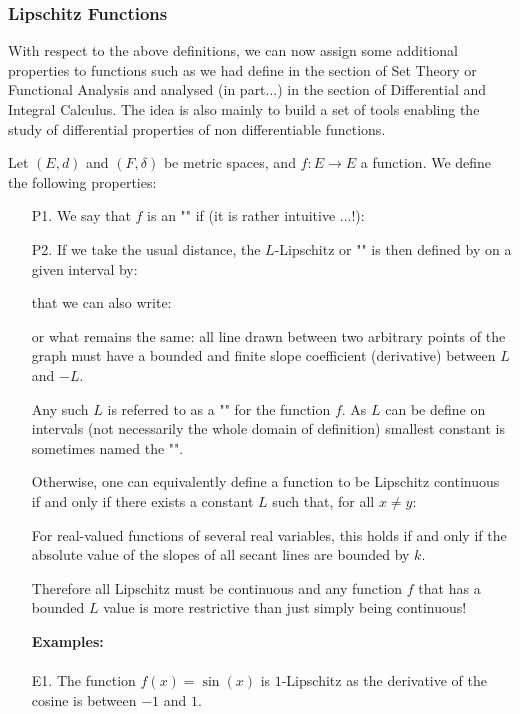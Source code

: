 	
	\subsubsection{Lipschitz Functions}\label{lipschitz functions}
	With respect to the above definitions, we can now assign some additional properties to functions such as we had define in the section of Set Theory or Functional Analysis and analysed (in part...) in the section of Differential and Integral Calculus. The idea is also mainly to build a set of tools enabling the study of differential properties of non differentiable functions.
	
	Let $(E, d)$ and $(F,\delta)$ be metric spaces, and $f:E \rightarrow E$ a function. We define the following properties:
	\begin{enumerate}
		\item[P1.] We say that $f$ is an "" if (it is rather intuitive ...!):
		
		
		\item[P2.] If we take the usual distance, the $L$-Lipschitz or "" is then defined by on a given interval by:
		
		that we can also write:
		
		or what remains the same: all line drawn between two arbitrary points of the graph must have a bounded and finite slope coefficient (derivative) between $L$ and $-L$.
		
		Any such $L$ is referred to as a "" for the function $f$. As $L$ can be define on intervals (not necessarily the whole domain of definition) smallest constant is sometimes named the "".
		
		Otherwise, one can equivalently define a function to be Lipschitz continuous if and only if there exists a constant $L$ such that, for all $x\neq y$:
		
		For real-valued functions of several real variables, this holds if and only if the absolute value of the slopes of all secant lines are bounded by $k$. 
		
		Therefore all Lipschitz must be continuous and any function $f$ that has a bounded $L$ value is more restrictive than just simply being continuous! 
		
		\begin{tcolorbox}[colframe=black,colback=white,sharp corners]
		\textbf{{\Large {}}Examples:}\\\\
		E1. The function $f(x)=\sin (x)$ is $1$-Lipschitz as the derivative of the cosine is between $-1$ and $1$.\\
		

\end{tcolorbox}
\end{enumerate}
